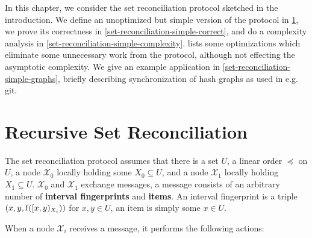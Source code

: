 
In this chapter, we consider the set reconciliation protocol sketched in the introduction.
We define an unoptimized but simple version of the protocol in \cref{set-reconciliation-simple-def}, we prove its correctness in \cref{set-reconciliation-simple-correct}, and do a complexity analysis in \cref{set-reconciliation-simple-complexity}.  lists some optimizations which eliminate some unnecessary work from the protocol, although not effecting the asymptotic complexity. We give an example application in \cref{set-reconciliation-simple-graphs}, briefly describing synchronization of hash graphs as used in e.g. git.


\section{Recursive Set Reconciliation}
\label{set-reconciliation-simple-def}

The set reconciliation protocol assumes that there is a set $U$, a linear order $\preceq$ on $U$, a node $\mathcal{X}_0$ locally holding some $X_0 \subseteq U$, and a node $\mathcal{X}_1$ locally holding $X_1 \subseteq U$.
$\mathcal{X}_0$ and $\mathcal{X}_1$ exchange messages, a message consists of an arbitrary number of \textbf{interval fingerprints} and \textbf{items}.
An interval fingerprint is a triple $({x}, {y}, {\operatorname{f}([{x},{y})_{X_i})})$ for $x, y \in U$, an item is simply some $x \in U$.

When a node $\mathcal{X}_i$ receives a message, it performs the following actions:

